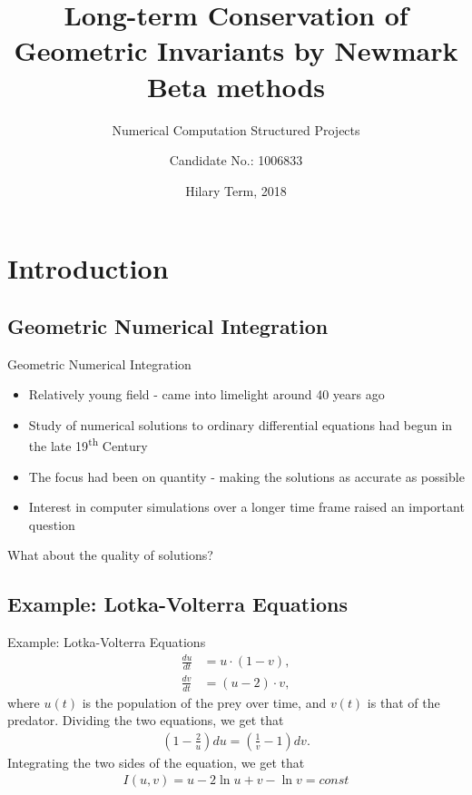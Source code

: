 \documentclass{beamer}
\title{Long-term Conservation of Geometric Invariants by Newmark Beta methods}
\subtitle{Numerical Computation Structured Projects}
\author{Candidate No.: 1006833}
\date{Hilary Term, 2018}
\begin{document}
{
\begin{frame}[noframenumbering]
	\titlepage
\end{frame}
}

\section{Introduction}
\subsection{Geometric Numerical Integration}
\begin{frame}{Geometric Numerical Integration}
	\begin{itemize}
		\item<1->
			Relatively young field - came into limelight around 40 years ago
		\item<1->
			Study of numerical solutions to ordinary differential equations had begun in the late 19\textsuperscript{th} Century
		\item<1->
			The focus had been on quantity - making the solutions as accurate as possible
		\item<1->
			Interest in computer simulations over a longer time frame raised an important question
	\end{itemize}
	 {\centering \alert{What about the quality of solutions?}}
\end{frame}

\subsection[Example]{Example: Lotka-Volterra Equations}
\begin{frame}{Example: Lotka-Volterra Equations}
\begin{align*}
	\frac{du}{dt} &= u\cdot(1-v),\\ 
	\frac{dv}{dt} &= (u-2)\cdot v,
\end{align*}
where $u(t)$ is the population of the prey over time, and $v(t)$ is that of the predator.
Dividing the two equations, we get that
\begin{align*}
\left(1 -  \frac{2}{u}\right) du = \left(\frac{1}{v} - 1\right) dv.
\end{align*}
Integrating the two sides of the equation, we get that
\begin{align*}
I(u, v) = u - 2\ln{u} +  v - \ln{v} = const
\end{align*}
\end{frame}
\end{document}
